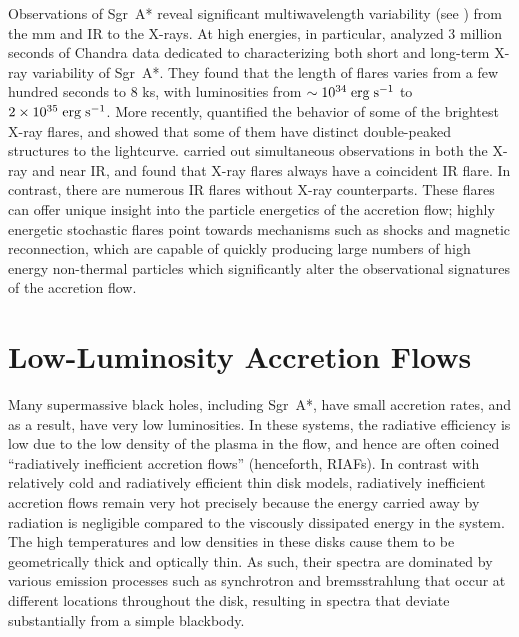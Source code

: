 Observations of Sgr~A* reveal significant multiwavelength variability (see \citealt{eckart2004, marrone2008, neilsen2013, witzel2013, ponti2015, li2015, wang2016}) from the mm and IR to the X-rays.  At high energies, in particular, \citet{neilsen2013} analyzed 3 million seconds of Chandra data dedicated to characterizing both short and long-term X-ray variability of Sgr~A*.  They found that the length of flares varies from a few hundred seconds to 8 ks, with luminosities from $\sim 10^{34} \; \rm{erg} \; \rm{s}^{-1}$ to $2 \times 10^{35} \; \rm{erg} \;  \rm{s}^{-1}$.  More recently, \citet{haggard2019} quantified the behavior of some of the brightest X-ray flares, and showed that some of them have distinct double-peaked structures to the lightcurve.  \citet{eckart2004} carried out simultaneous observations in both the X-ray and near IR, and found that X-ray flares always have a coincident IR flare.  In contrast, there are numerous IR flares without X-ray counterparts.  These flares can offer unique insight into the particle energetics of the accretion flow; highly energetic stochastic flares point towards mechanisms such as shocks and magnetic reconnection, which are capable of quickly producing large numbers of high energy non-thermal particles which significantly alter the observational signatures of the accretion flow.

\section{Low-Luminosity Accretion Flows}
Many supermassive black holes, including Sgr~A*, have small accretion rates, and as a result, have very low luminosities.  In these systems, the radiative efficiency is low due to the low density of the plasma in the flow, and hence are often coined ``radiatively inefficient accretion flows'' (henceforth, RIAFs).  In contrast with relatively cold and radiatively efficient thin disk models, radiatively inefficient accretion flows remain very hot precisely because the energy carried away by radiation is negligible compared to the viscously dissipated energy in the system.  The high temperatures and low densities in these disks cause them to be geometrically thick and optically thin.  As such, their spectra are dominated by various emission processes such as synchrotron and bremsstrahlung that occur at different locations throughout the disk, resulting in spectra that deviate substantially from a simple blackbody.

